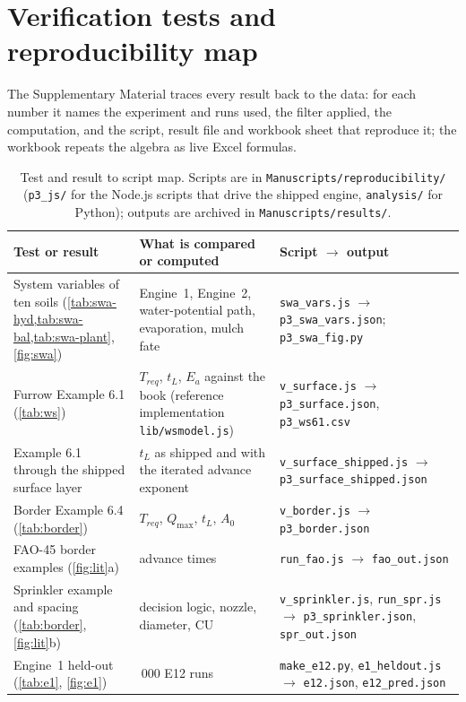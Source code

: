 \section{Verification tests and reproducibility map}\label{app:repro}
The Supplementary Material traces every result back to the data: for each number it names the experiment and runs used, the filter applied, the computation, and the script, result file and workbook sheet that reproduce it; the workbook repeats the algebra as live Excel formulas.
\begin{table}[H]\centering\small
\caption{Test and result to script map. Scripts are in \texttt{Manuscripts/reproducibility/} (\texttt{p3\_js/} for the Node.js scripts that drive the shipped engine, \texttt{analysis/} for Python); outputs are archived in \texttt{Manuscripts/results/}.}
\begin{tabularx}{\textwidth}{>{\raggedright\arraybackslash}p{4.2cm}>{\raggedright\arraybackslash}p{3.6cm}X}
\toprule
Test or result & What is compared or computed & Script $\to$ output\\\midrule
System variables of ten soils (\cref{tab:swa-hyd,tab:swa-bal,tab:swa-plant}, \cref{fig:swa}) & Engine~1, Engine~2, water-potential path, evaporation, mulch fate & \texttt{swa\_vars.js} $\to$ \texttt{p3\_swa\_vars.json}; \texttt{p3\_swa\_fig.py}\\
Furrow Example 6.1 (\cref{tab:ws}) & $T_{req}$, $t_L$, $E_a$ against the book (reference implementation \texttt{lib/wsmodel.js}) & \texttt{v\_surface.js} $\to$ \texttt{p3\_surface.json}, \texttt{p3\_ws61.csv}\\
Example 6.1 through the shipped surface layer & $t_L$ as shipped and with the iterated advance exponent & \texttt{v\_surface\_shipped.js} $\to$ \texttt{p3\_surface\_shipped.json}\\
Border Example 6.4 (\cref{tab:border}) & $T_{req}$, $Q_{\max}$, $t_L$, $A_0$ & \texttt{v\_border.js} $\to$ \texttt{p3\_border.json}\\
FAO-45 border examples (\cref{fig:lit}a) & 13 advance times & \texttt{run\_fao.js} $\to$ \texttt{fao\_out.json}\\
Sprinkler example and spacing (\cref{tab:border}, \cref{fig:lit}b) & decision logic, nozzle, diameter, CU & \texttt{v\_sprinkler.js}, \texttt{run\_spr.js} $\to$ \texttt{p3\_sprinkler.json}, \texttt{spr\_out.json}\\
Engine~1 held-out (\cref{tab:e1}, \cref{fig:e1}) & 1\,000 E12 runs & \texttt{make\_e12.py}, \texttt{e1\_heldout.js} $\to$ \texttt{e12.json}, \texttt{e12\_pred.json}\\

\end{tabularx}
\end{table}
